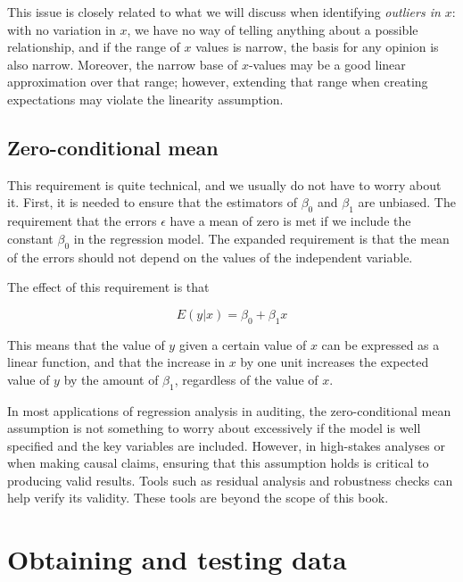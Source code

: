 This issue is closely related to what we will discuss when identifying \emph{outliers in $x$}: with no variation in $x$, we have no way of telling anything about a possible relationship, and if the range of $x$ values is narrow, the basis for any opinion is also narrow. Moreover, the narrow base of $x$-values may be a good linear approximation over that range; however, extending that range when creating expectations may violate the linearity assumption.


\subsection{Zero-conditional mean} %
\label{sub:zero_conditional_mean}

This requirement is quite technical, and we usually do not have to worry about it. First, it is needed to ensure that the estimators of $\beta_0$ and $\beta_1$ are unbiased. The requirement that the errors $\epsilon$ have a mean of zero is met if we include the constant $\beta_0$ in the regression model. The expanded requirement is that the mean of the errors should not depend on the values of the independent variable. 

The effect of this requirement is that

\begin{equation}
E(y | x) = \beta_0 + \beta_1x
\end{equation}

This means that the value of $y$ given a certain value of $x$ can be expressed as a linear function, and that the increase in $x$ by one unit increases the expected value of $y$ by the amount of $\beta_1$, regardless of the value of $x$.

In most applications of regression analysis in auditing, the zero-conditional mean assumption is not something to worry about excessively if the model is well specified and the key variables are included. However, in high-stakes analyses or when making causal claims, ensuring that this assumption holds is critical to producing valid results. Tools such as residual analysis and robustness checks can help verify its validity. These tools are beyond the scope of this book.


\section{Obtaining and testing data} %
\label{sec:obtaining_and_testing_data}

